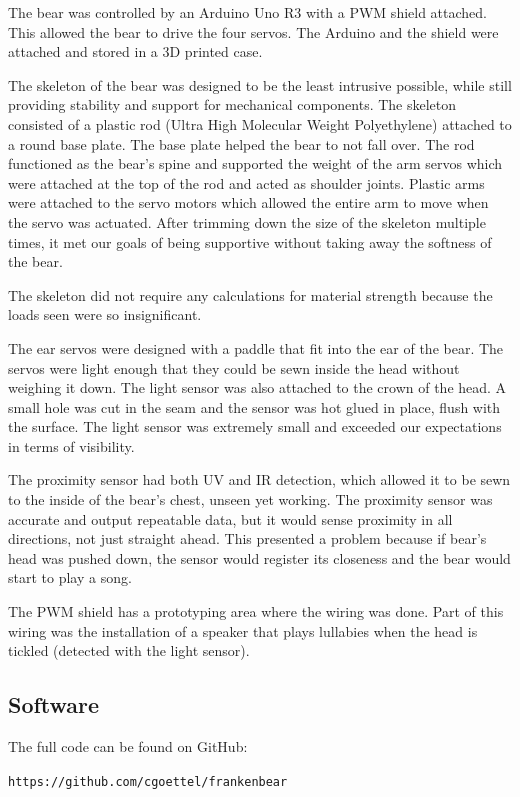\documentclass{article}
\begin{document}
The bear was controlled by an Arduino Uno R3 with a PWM shield attached. This allowed the bear to drive the four servos. The Arduino and the shield were attached and stored in a 3D printed case.

The skeleton of the bear was designed to be the least intrusive possible, while still providing stability and support for mechanical components. The skeleton consisted of a plastic rod (Ultra High Molecular Weight Polyethylene) attached to a round base plate. The base plate helped the bear to not fall over. The rod functioned as the bear's spine and supported the weight of the arm servos which were attached at the top of the rod and acted as shoulder joints. Plastic arms were attached to the servo motors which allowed the entire arm to move when the servo was actuated. After trimming down the size of the skeleton multiple times, it met our goals of being supportive without taking away the softness of the bear.

The skeleton did not require any calculations for material strength because the loads seen were so insignificant.

The ear servos were designed with a paddle that fit into the ear of the bear. The servos were light enough that they could be sewn inside the head without weighing it down. The light sensor was also attached to the crown of the head. A small hole was cut in the seam and the sensor was hot glued in place, flush with the surface. The light sensor was extremely small and exceeded our expectations in terms of visibility.

The proximity sensor had both UV and IR detection, which allowed it to be sewn to the inside of the bear's chest, unseen yet working. The proximity sensor was accurate and output repeatable data, but it would sense proximity in all directions, not just straight ahead. This presented a problem because if bear's head was pushed down, the sensor would register its closeness and the bear would start to play a song.

The PWM shield has a prototyping area where the wiring was done. Part of this wiring was the installation of a speaker that plays lullabies when the head is tickled (detected with the light sensor).

\subsection{Software}
The full code can be found on GitHub:

\hfil\texttt{https://github.com/cgoettel/frankenbear}\hfil
\end{document}

